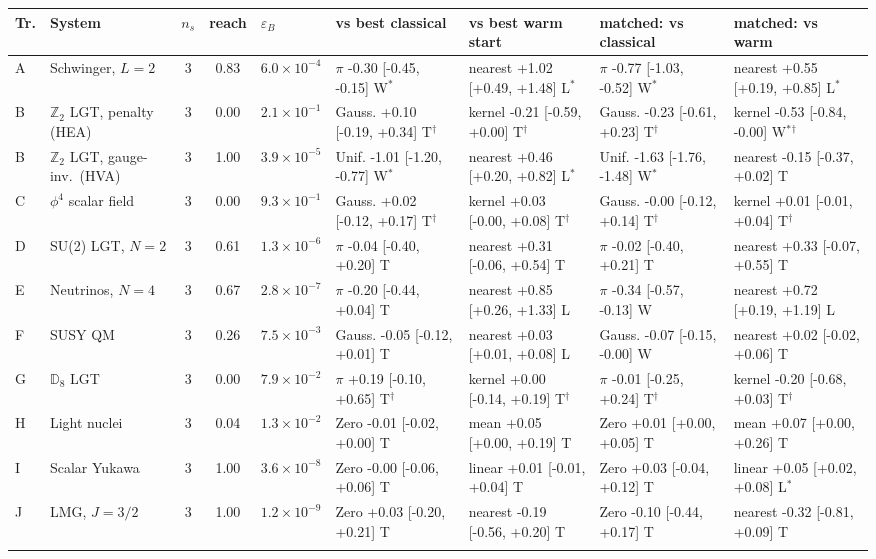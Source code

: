 \begin{tabular}{@{}llcclllll@{}}
\toprule
Tr. & System & $n_s$ & reach & $\varepsilon_B$ & vs best classical & vs best warm start & matched: vs classical & matched: vs warm \\
\midrule
A & Schwinger, $L{=}2$ & 3 & 0.83 & $6.0\!\times\!10^{-4}$ & $\pi$ -0.30 [-0.45, -0.15] W$^\ast$ & nearest +1.02 [+0.49, +1.48] L$^\ast$ & $\pi$ -0.77 [-1.03, -0.52] W$^\ast$ & nearest +0.55 [+0.19, +0.85] L$^\ast$ \\
B & $\mathbb{Z}_2$ LGT, penalty (HEA) & 3 & 0.00 & $2.1\!\times\!10^{-1}$ & Gauss. +0.10 [-0.19, +0.34] T$^\dagger$ & kernel -0.21 [-0.59, +0.00] T$^\dagger$ & Gauss. -0.23 [-0.61, +0.23] T$^\dagger$ & kernel -0.53 [-0.84, -0.00] W$^\ast$$^\dagger$ \\
B & $\mathbb{Z}_2$ LGT, gauge-inv.\ (HVA) & 3 & 1.00 & $3.9\!\times\!10^{-5}$ & Unif. -1.01 [-1.20, -0.77] W$^\ast$ & nearest +0.46 [+0.20, +0.82] L$^\ast$ & Unif. -1.63 [-1.76, -1.48] W$^\ast$ & nearest -0.15 [-0.37, +0.02] T \\
C & $\phi^4$ scalar field & 3 & 0.00 & $9.3\!\times\!10^{-1}$ & Gauss. +0.02 [-0.12, +0.17] T$^\dagger$ & kernel +0.03 [-0.00, +0.08] T$^\dagger$ & Gauss. -0.00 [-0.12, +0.14] T$^\dagger$ & kernel +0.01 [-0.01, +0.04] T$^\dagger$ \\
D & SU(2) LGT, $N{=}2$ & 3 & 0.61 & $1.3\!\times\!10^{-6}$ & $\pi$ -0.04 [-0.40, +0.20] T & nearest +0.31 [-0.06, +0.54] T & $\pi$ -0.02 [-0.40, +0.21] T & nearest +0.33 [-0.07, +0.55] T \\
E & Neutrinos, $N{=}4$ & 3 & 0.67 & $2.8\!\times\!10^{-7}$ & $\pi$ -0.20 [-0.44, +0.04] T & nearest +0.85 [+0.26, +1.33] L & $\pi$ -0.34 [-0.57, -0.13] W & nearest +0.72 [+0.19, +1.19] L \\
F & SUSY QM & 3 & 0.26 & $7.5\!\times\!10^{-3}$ & Gauss. -0.05 [-0.12, +0.01] T & nearest +0.03 [+0.01, +0.08] L & Gauss. -0.07 [-0.15, -0.00] W & nearest +0.02 [-0.02, +0.06] T \\
G & $\mathbb{D}_8$ LGT & 3 & 0.00 & $7.9\!\times\!10^{-2}$ & $\pi$ +0.19 [-0.10, +0.65] T$^\dagger$ & kernel +0.00 [-0.14, +0.19] T$^\dagger$ & $\pi$ -0.01 [-0.25, +0.24] T$^\dagger$ & kernel -0.20 [-0.68, +0.03] T$^\dagger$ \\
H & Light nuclei & 3 & 0.04 & $1.3\!\times\!10^{-2}$ & Zero -0.01 [-0.02, +0.00] T & mean +0.05 [+0.00, +0.19] T & Zero +0.01 [+0.00, +0.05] T & mean +0.07 [+0.00, +0.26] T \\
I & Scalar Yukawa & 3 & 1.00 & $3.6\!\times\!10^{-8}$ & Zero -0.00 [-0.06, +0.06] T & linear +0.01 [-0.01, +0.04] T & Zero +0.03 [-0.04, +0.12] T & linear +0.05 [+0.02, +0.08] L$^\ast$ \\
J & LMG, $J{=}3/2$ & 3 & 1.00 & $1.2\!\times\!10^{-9}$ & Zero +0.03 [-0.20, +0.21] T & nearest -0.19 [-0.56, +0.20] T & Zero -0.10 [-0.44, +0.17] T & nearest -0.32 [-0.81, +0.09] T \\
\botrule
\end{tabular}
